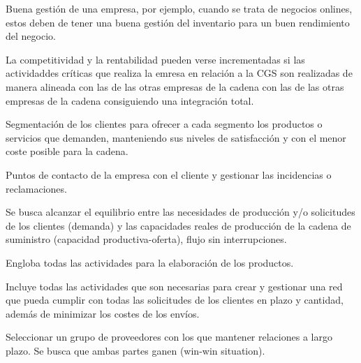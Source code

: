 \documentclass[12pt]{report} %
\begin{document}
\begin{definicion}[Omnichannel]
Buena gestión de una empresa, por ejemplo, cuando se trata de negocios onlines, estos deben de tener una buena gestión del inventario para un buen rendimiento del negocio.
\end{definicion}

La competitividad y la rentabilidad pueden verse incrementadas si las
actividaddes críticas que realiza la emresa en relación a la CGS son
realizadas de manera alineada con las de las otras empresas de la cadena
con las de las otras empresas de la cadena consiguiendo una integración
total.


\begin{definicion}
Segmentación de los clientes para ofrecer a cada segmento los productos o servicios que demanden, manteniendo sus niveles de satisfacción y con el menor coste posible para la cadena.
\end{definicion}

\begin{definicion}
Puntos de contacto de la empresa con el cliente y gestionar las incidencias o reclamaciones.
\end{definicion}

\begin{definicion}
Se busca alcanzar el equilibrio entre las necesidades de producción y/o solicitudes de los clientes (demanda) y las capacidades reales de producción de la cadena de suministro (capacidad productiva-oferta), flujo sin interrupciones.
\end{definicion}

\begin{definicion}
Engloba todas las actividades para la elaboración de los productos.
\end{definicion}

\begin{definicion}
Incluye todas las actividades que son necesarias para crear y gestionar una red que pueda cumplir con todas las solicitudes de los clientes en plazo y cantidad, además de minimizar los costes de los envíos.
\end{definicion}

\begin{definicion}
Seleccionar un grupo de proveedores con los que mantener relaciones a largo plazo. Se busca que ambas partes ganen (win-win situation).
\end{definicion}
\end{document}
